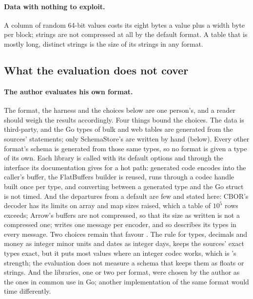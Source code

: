 \paragraph{Data with nothing to exploit.} A column of random 64-bit values
costs its eight bytes a value plus a width byte per block; strings are not
compressed at all by the default format. A table that is mostly long,
distinct strings is the size of its strings in any format.

\subsection{What the evaluation does not cover}

\paragraph{The author evaluates his own format.} The format, the harness and
the choices below are one person's, and a reader should weigh the results
accordingly. Four things bound the choices. The data is third-party, and the
Go types of  bulk and
 web tables are generated from the
sources'  statements; only SchemaStore's are written by
hand (below). Every other format's schema is generated from those same
types, so no format is given a type of its own. Each library is called with
its default options and through the interface its documentation gives for a
hot path: generated code encodes into the caller's buffer, the FlatBuffers
builder is reused, \colbin{} runs through a codec handle built once per
type, and converting between a generated type and the Go struct is not
timed. And the departures from a default are few and stated here: CBOR's
decoder has its limits on array and map sizes raised, which a table of
$10^5$ rows exceeds; Arrow's buffers are not compressed, so that its size as
written is not a compressed one;  writes one message per encoder,
and so describes its types in every message. Two choices remain that favour
\colbin{}. The rule for types, decimals and money as integer minor units and
dates as integer days, keeps the sources' exact types exact, but it puts
most values where an integer codec works, which is \colbin{}'s strength; the
evaluation does not measure a schema that keeps them as floats or strings.
And the
libraries, one or two per format, were chosen by the author as the ones in
common use in Go; another implementation of the same format would time
differently.

